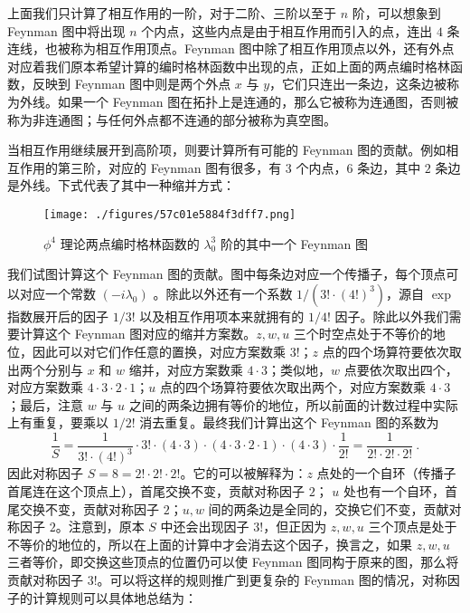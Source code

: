 上面我们只计算了相互作用的一阶，对于二阶、三阶以至于 $n$ 阶，可以想象到 Feynman 图中将出现 $n$ 个内点，这些内点是由于相互作用而引入的点，连出 $4$ 条连线，也被称为相互作用顶点。Feynman 图中除了相互作用顶点以外，还有外点对应着我们原本希望计算的编时格林函数中出现的点，正如上面的两点编时格林函数，反映到 Feynman 图中则是两个外点 $x$ 与 $y$，它们只连出一条边，这条边被称为外线。如果一个 Feynman 图在拓扑上是连通的，那么它被称为连通图，否则被称为非连通图；与任何外点都不连通的部分被称为真空图。

当相互作用继续展开到高阶项，则要计算所有可能的 Feynman 图的贡献。例如相互作用的第三阶，对应的 Feynman 图有很多，有 $3$ 个内点，$6$ 条边，其中 $2$ 条边是外线。下式代表了其中一种缩并方式：
\begin{figure}[ht]
\centering
\texttt{[image: ./figures/57c01e5884f3dff7.png]}
\caption{$\phi^4$ 理论两点编时格林函数的 $\lambda_0^3$ 阶的其中一个 Feynman 图} \label{fig_wick2}
\end{figure}

我们试图计算这个 Feynman 图的贡献。图中每条边对应一个传播子，每个顶点可以对应一个常数 $(-i\lambda_0)$ 。除此以外还有一个系数 $1/(3!\cdot (4!)^3)$，源自 $\exp$ 指数展开后的因子 $1/3!$ 以及相互作用项本来就拥有的 $1/4!$ 因子。除此以外我们需要计算这个 Feynman 图对应的缩并方案数。$z,w,u$ 三个时空点处于不等价的地位，因此可以对它们作任意的置换，对应方案数乘 $3!$；$z$ 点的四个场算符要依次取出两个分别与 $x$ 和 $w$ 缩并，对应方案数乘 $4\cdot 3$；类似地，$w$ 点要依次取出四个，对应方案数乘 $4\cdot 3\cdot 2\cdot 1$；$u$ 点的四个场算符要依次取出两个，对应方案数乘 $4\cdot 3$；最后，注意 $w$ 与 $u$ 之间的两条边拥有等价的地位，所以前面的计数过程中实际上有重复，要乘以 $1/2!$ 消去重复。最终我们计算出这个 Feynman 图的系数为
\begin{equation}
\frac{1}{S}=\frac{1}{3!\cdot (4!)^3}\cdot 3! \cdot (4\cdot 3)\cdot (4\cdot 3\cdot 2\cdot 1)\cdot (4\cdot 3)\cdot \frac{1}{2!}=\frac{1}{2!\cdot 2!\cdot 2!}~.
\end{equation}
因此对称因子 $S=8=2!\cdot 2!\cdot 2!$。它的可以被解释为：$z$ 点处的一个自环（传播子首尾连在这个顶点上），首尾交换不变，贡献对称因子 $2$； $u$ 处也有一个自环，首尾交换不变，贡献对称因子 $2$；$u,w$ 间的两条边是全同的，交换它们不变，贡献对称因子 $2$。注意到，原本 $S$ 中还会出现因子 $3!$，但正因为 $z,w,u$ 三个顶点是处于不等价的地位的，所以在上面的计算中才会消去这个因子，换言之，如果 $z,w,u$ 三者等价，即交换这些顶点的位置仍可以使 Feynman 图同构于原来的图，那么将贡献对称因子 $3!$。可以将这样的规则推广到更复杂的 Feynman 图的情况，对称因子的计算规则可以具体地总结为：

